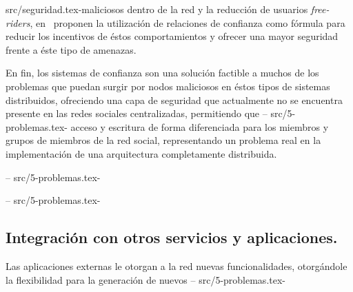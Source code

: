 src/seguridad.tex-maliciosos dentro de la red y la reducción de usuarios \textit{free-riders},
                  en~\cite{Altmann:2009:PFS:1719850.1719891}
                  proponen la  utilización de relaciones de confianza como fórmula para reducir
                  los incentivos de éstos comportamientos y ofrecer una mayor seguridad frente a
                  éste tipo de amenazas. %
                  
                  En fin, los sistemas de confianza son una solución factible a muchos de los
                  problemas que puedan surgir por nodos maliciosos en éstos tipos de sistemas
                  distribuidos, ofreciendo una capa de seguridad que actualmente no se
                  encuentra presente en las redes sociales centralizadas, permitiendo que
--
src/5-problemas.tex-    acceso y escritura de forma diferenciada para los miembros y grupos de miembros
                        de la red social, representando un problema real en la implementación de una
                        arquitectura completamente distribuida. 
                        
--
src/5-problemas.tex-    %
                        
                        
                        
--
src/5-problemas.tex-
                    \subsection{Integración con otros servicios y aplicaciones.}
                    \label{sec:conectividad}
                        Las aplicaciones externas le otorgan a la red nuevas
                        funcionalidades, otorgándole la flexibilidad para la generación de nuevos
--
src/5-problemas.tex-    %
                        
